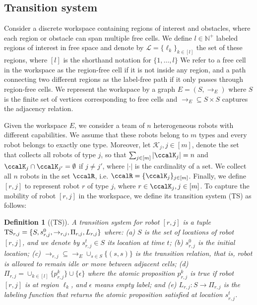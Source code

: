\documentclass[Afour,sageh,times]{sagej}
\newtheorem{defn}[thm]{Definition}
\begin{document}
\subsection{Transition system}\label{sec:ts}
Consider a discrete workspace containing regions of interest and obstacles, where each region or obstacle can span multiple free cells. We define $l\in \mathbb{N}^+$ labeled regions of interest in free space and denote by $\mathcal{L}=\{\ell_k\}_{k\in[l]}$ the set of these regions, where $[l]$ is the shorthand notation for $\{1, \ldots, l\}$
We refer to a free cell in the workspace as the region-free cell if it is not inside any region, and a path connecting two different regions as the label-free path if it only passes through region-free cells.  We represent the workspace by a graph $E = (S, \to_E)$ where $S$ is the finite set of vertices corresponding to free cells and $\to_{E} \subseteq S \times S$ captures the adjacency relation.

 Given the workspace $E$, we consider a team of $n$ heterogeneous robots with different capabilities. We assume that these robots belong to $m$ types and every robot belongs to exactly one type. Moreover, let $\mathcal{K}_j, j\in[m]$,  denote the set that  collects all robots of type $j$, so that $\sum_{j\in [m]} |\ccalK_j| = n$ and $\ccalK_{j} \cap \ccalK_{j'} = \emptyset$ if $j \not= j'$, where $|\cdot|$ is the cardinality of a set. We collect all $n$ robots in the set $\ccalR$, i.e. $\ccalR = \{\ccalK_j\}_{j\in [m]}$. Finally, we define $[r,j]$ to represent robot $r$ of type $j$, where $r\in \ccalK_j, j\in [m]$. To capture the mobility of robot $[r,j]$ in the workspace, we define its transition system (TS) as follows:

\begin{defn}[(TS)]\label{def:ts}
  A transition system for robot $[r,j]$ is a tuple $\textup{TS}_{r,j} = \{S, s_{r,j}^0, \to_{r,j}, \Pi_{r,j}, L_{r,j}\}$ where: (a) $S$ is the set of locations of robot $[r,j]$, and we denote by $s_{r,j}^t \in S$ its location at time $t$; (b) $s_{r,j}^0$ is the initial location; (c) $\to_{r,j} \subseteq \to_{E} \cup_{s\in S} \{(s,s)\} $ is the transition relation, that is, robot is allowed to remain idle or move between adjacent cells; (d) $\Pi_{r,j} = \cup_{k\in [l]}\{p_{r,j}^k\} \cup \{\epsilon\}$ where the atomic proposition $p_{r,j}^{k}$ is true if robot $[r,j]$ is at region $\ell_k$, and $\epsilon$ means empty label; and (e) $L_{r,j}: S \to {\Pi_{r,j}} $ is the labeling function that returns the atomic proposition  satisfied at location $s_{r,j}^t$.
\end{defn}
\end{document}
